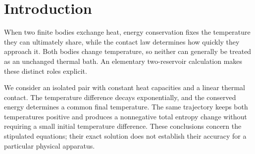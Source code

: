 \section{Introduction}
When two finite bodies exchange heat, energy conservation fixes the temperature they can ultimately share, while the contact law determines how quickly they approach it. Both bodies change temperature, so neither can generally be treated as an unchanged thermal bath. An elementary two-reservoir calculation makes these distinct roles explicit.

We consider an isolated pair with constant heat capacities and a linear thermal contact. The temperature difference decays exponentially, and the conserved energy determines a common final temperature. The same trajectory keeps both temperatures positive and produces a nonnegative total entropy change without requiring a small initial temperature difference. These conclusions concern the stipulated equations; their exact solution does not establish their accuracy for a particular physical apparatus.
